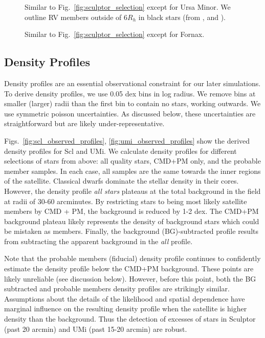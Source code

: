 \begin{figure}
\centering
{}
\caption[Ursa Minor sample selection]{Similar to
Fig.~\ref{fig:sculptor_selection} except for Ursa Minor. We outline RV
members outside of \(6R_h\) in black stars (from \citet{sestito+2023b},
\citet{pace+2020} and \citet{spencer+2018}).}\label{fig:umi_selection}
\end{figure}

\begin{figure}
\centering
{}
\caption[Fornax sample selection]{Similar to
Fig.~\ref{fig:sculptor_selection} except for
Fornax.}\label{fig:fornax_selection}
\end{figure}

\subsection{Density Profiles}\label{density-profiles}

Density profiles are an essential observational constraint for our later
simulations. To derive density profiles, we use 0.05 dex bins in log
radius. We remove bins at smaller (larger) radii than the first bin to
contain no stars, working outwards. We use symmetric poisson
uncertainties. As discussed below, these uncertainties are
straightforward but are likely under-representative.

Figs.~\ref{fig:scl_observed_profiles}, \ref{fig:umi_observed_profiles}
show the derived density profiles for Scl and UMi. We calculate density
profiles for different selections of stars from above: all quality
stars, CMD+PM only, and the probable member samples. In each case, all
samples are the same towards the inner regions of the satellite.
Classical dwarfs dominate the stellar density in their cores. However,
the density profile \emph{all stars} plateaus at the total background in
the field at radii of 30-60 arcminutes. By restricting stars to being
most likely satellite members by CMD + PM, the background is reduced by
1-2 dex. The CMD+PM background plateau likely represents the density of
background stars which could be mistaken as members. Finally, the
background (BG)-subtracted profile results from subtracting the apparent
background in the \emph{all} profile.

Note that the probable members (fiducial) density profile continues to
confidently estimate the density profile below the CMD+PM background.
These points are likely unreliable (see discussion below). However,
before this point, both the BG subtracted and probable members density
profiles are strikingly similar. Assumptions about the details of the
likelihood and spatial dependence have marginal influence on the
resulting density profile when the satellite is higher density than the
background. Thus the detection of excesses of stars in Sculptor (past 20
arcmin) and UMi (past 15-20 arcmin) are robust.

